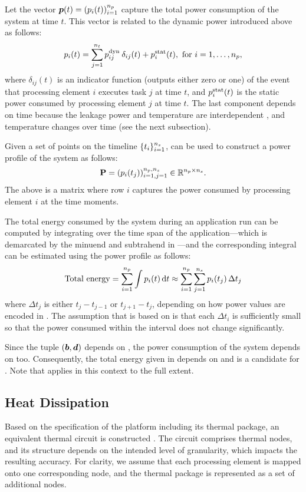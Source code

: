Let the vector $\boldsymbol{p}(t) = (p_i(t))_{i = 1}^{n_{p}}$ capture the total power
consumption of the system at time $t$. This vector is related to the dynamic
power introduced above as follows:
\[
  p_i(t) = \sum_{j = 1}^{n_{t}} p^{\mathrm{dyn}}_{ij} \: \delta_{ij} (t) + p^{\mathrm{stat}}_i(t), \text{ for $i = 1, \dots, {n_{p}}$},
\]
where $\delta_{ij}(t)$ is an indicator function (outputs either zero or one) of
the event that processing element $i$ executes task $j$ at time $t$, and
$p^{\mathrm{stat}}_i(t)$ is the static power consumed by processing element $j$ at time
$t$. The last component depends on time because the leakage power and
temperature are interdependent \cite{liu2007}, and temperature changes over time
(see the next subsection).

Given a set of \ns points on the timeline $\{ t_i \}_{i = 1}^{n_{s}}$, 
can be used to construct a power profile of the system as follows:
\[
  \mathbf{P} = (p_i(t_j))_{i = 1, j = 1}^{{n_{p}}, {n_{s}}} \in \mathbb{R}^{{n_{p}} \times {n_{s}}}.
\]
The above is a matrix where row $i$ captures the power consumed by processing
element $i$ at the \ns time moments.

The total energy consumed by the system during an application run can be
computed by integrating  over the time span of the
application---which is demarcated by the minuend and subtrahend in
---and the corresponding integral can be estimated using
the power profile as follows:
\[
  \text{Total energy} = \sum_{i = 1}^{n_{p}} \int p_i(t) \, \mathrm{d} t \approx \sum_{i = 1}^{n_{p}} \sum_{j = 1}^{n_{s}} p_i(t_j) \, \Delta t_j
\]
where $\Delta t_j$ is either $t_j - t_{j - 1}$ or $t_{j + 1} - t_j$, depending
on how power values are encoded in \mp. The assumption that 
is based on is that each $\Delta t_i$ is sufficiently small so that the power
consumed within the interval does not change significantly.

Since the tuple $(\boldsymbol{b}, \boldsymbol{d})$ depends on \vu, the power consumption of the
system depends on \vu too. Consequently, the total energy given in
 depends on \vu and is a candidate for \g. Note that
 applies in this context to the full extent.

\subsection{Heat Dissipation}

Based on the specification of the platform including its thermal package, an
equivalent thermal  circuit is constructed \cite{skadron2004}. The
circuit comprises \nn thermal nodes, and its structure depends on the intended
level of granularity, which impacts the resulting accuracy. For clarity, we
assume that each processing element is mapped onto one corresponding node, and
the thermal package is represented as a set of additional nodes.

